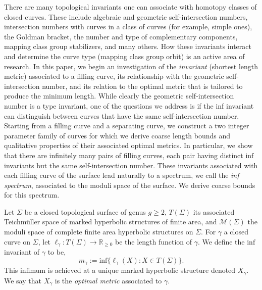 \documentclass[12pt]{amsart}
\numberwithin{equation}{section}
\theoremstyle{plain}
\begin{document}
There are many topological invariants  one can associate with homotopy classes of closed curves. These include algebraic and geometric self-intersection numbers, intersection numbers  with curves in a class of curves (for example, simple ones),  the Goldman bracket, the number and type of complementary components, mapping class group stabilizers, and many others. How these invariants interact and determine the curve type (mapping class group orbit) is an active area of research.
In this paper, we begin an investigation of  the {\it {}  invariant}  (shortest length metric) associated to a filling curve,  its relationship with the  geometric self-intersection number,  and its relation to the optimal metric that is tailored to produce the minimum length.  While clearly the geometric self-intersection number is a type  invariant,   one of the questions we address is if the inf invariant can distinguish between curves that have the same self-intersection number.  Starting from a filling curve and a separating curve, we construct a two integer parameter family of curves for which we derive coarse length bounds and qualitative properties of their associated optimal metrics. In particular, we show that there are infinitely many pairs of filling curves, each pair having distinct $\text{inf}$ invariants but the same self-intersection number.  These invariants associated with each filling curve of the surface lead naturally to a spectrum, we call the {\it inf spectrum}, associated to the moduli space of the surface. We derive coarse bounds for this spectrum.


Let $\Sigma$ be a closed topological surface of genus $g \geq 2$, $T(\Sigma)$ its associated  Teichm\"uller space of marked hyperbolic structures of finite area,  and
 $\mathcal{M}(\Sigma)$  the moduli space of complete finite area hyperbolic structures on $\Sigma$. For   $\gamma$ a closed curve on 
$\Sigma$,  let   
$\ell_{\gamma}: T(\Sigma) \rightarrow \mathbb{R}_{\geq 0}$ be the length function of $\gamma$.   We define the $\text{inf}$ invariant of $\gamma$ to be,
$$
m_{\gamma}:=
\text{inf} \{\ell_{\gamma}(X): X \in T(\Sigma) \}.
$$
 This infimum is achieved at a unique marked hyperbolic structure denoted $X_{\gamma}$. We say that $X_{\gamma}$
is the {\it optimal metric}  associated to $\gamma$.
\end{document}

